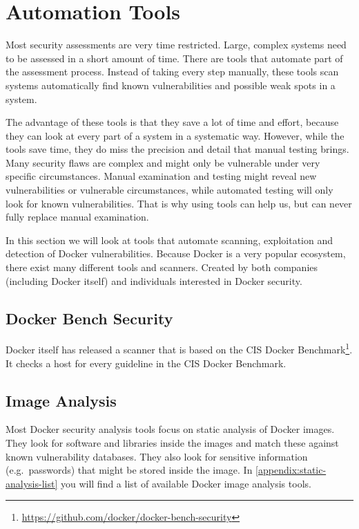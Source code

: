 \section{Automation Tools}\label{section:tools}
Most security assessments are very time restricted. Large, complex systems need to be assessed in a short amount of time. There are tools that automate part of the assessment process. Instead of taking every step manually, these tools scan systems automatically find known vulnerabilities and possible weak spots in a system.

The advantage of these tools is that they save a lot of time and effort, because they can look at every part of a system in a systematic way. However, while the tools save time, they do miss the precision and detail that manual testing brings. Many security flaws are complex and might only be vulnerable under very specific circumstances. Manual examination and testing might reveal new vulnerabilities or vulnerable circumstances, while automated testing will only look for known vulnerabilities. That is why using tools can help us, but can never fully replace manual examination.

\medskip

In this section we will look at tools that automate scanning, exploitation and detection of Docker vulnerabilities. Because Docker is a very popular ecosystem, there exist many different tools and scanners. Created by both companies (including Docker itself) and individuals interested in Docker security.

\subsection{Docker Bench Security}
Docker itself has released a scanner that is based on the CIS Docker Benchmark\footnote{\url{https://github.com/docker/docker-bench-security}}. It checks a host for every guideline in the CIS Docker Benchmark.

\subsection{Image Analysis}\label{subsection:image-analysis-tools}
Most Docker security analysis tools focus on static analysis of Docker images. They look for software and libraries inside the images and match these against known vulnerability databases. They also look for sensitive information (e.g.\ passwords) that might be stored inside the image. In \autoref{appendix:static-analysis-list} you will find a list of available Docker image analysis tools.

